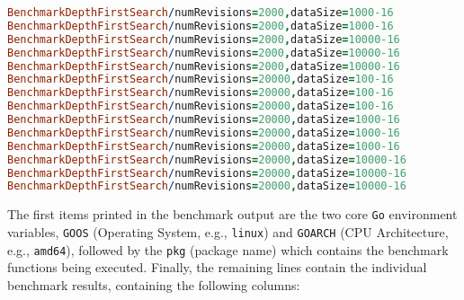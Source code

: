 \begin{lstlisting}[language=prolog]
BenchmarkDepthFirstSearch/numRevisions=2000,dataSize=1000-16       	   39249	     92207 ns/op	   47674 B/op	      68 allocs/op
BenchmarkDepthFirstSearch/numRevisions=2000,dataSize=1000-16       	   39244	     93255 ns/op	   47894 B/op	      68 allocs/op
BenchmarkDepthFirstSearch/numRevisions=2000,dataSize=10000-16      	   41174	     83079 ns/op	   47819 B/op	      68 allocs/op
BenchmarkDepthFirstSearch/numRevisions=2000,dataSize=10000-16      	   41455	     83561 ns/op	   47678 B/op	      68 allocs/op
BenchmarkDepthFirstSearch/numRevisions=2000,dataSize=10000-16      	   43261	     83705 ns/op	   48038 B/op	      68 allocs/op
BenchmarkDepthFirstSearch/numRevisions=20000,dataSize=100-16       	    3747	   1041382 ns/op	  479952 B/op	     364 allocs/op
BenchmarkDepthFirstSearch/numRevisions=20000,dataSize=100-16       	    3386	   1035490 ns/op	  477039 B/op	     362 allocs/op
BenchmarkDepthFirstSearch/numRevisions=20000,dataSize=100-16       	    3760	   1023241 ns/op	  472936 B/op	     360 allocs/op
BenchmarkDepthFirstSearch/numRevisions=20000,dataSize=1000-16      	    3687	    881654 ns/op	  471495 B/op	     358 allocs/op
BenchmarkDepthFirstSearch/numRevisions=20000,dataSize=1000-16      	    4036	    883816 ns/op	  479999 B/op	     364 allocs/op
BenchmarkDepthFirstSearch/numRevisions=20000,dataSize=1000-16      	    4092	    876104 ns/op	  476561 B/op	     363 allocs/op
BenchmarkDepthFirstSearch/numRevisions=20000,dataSize=10000-16     	    4383	    820963 ns/op	  472796 B/op	     360 allocs/op
BenchmarkDepthFirstSearch/numRevisions=20000,dataSize=10000-16     	    4129	    829324 ns/op	  480041 B/op	     366 allocs/op
BenchmarkDepthFirstSearch/numRevisions=20000,dataSize=10000-16     	    3768	    825202 ns/op	  474170 B/op	     361 allocs/op
\end{lstlisting}
\medskip

The first items printed in the benchmark output are the two core \lstinline{Go} environment variables, \lstinline{GOOS} (Operating System, e.g., \lstinline{linux}) and \lstinline{GOARCH} (CPU Architecture, e.g., \lstinline{amd64}), followed by the \lstinline{pkg} (package name) which contains the benchmark functions being executed. Finally, the remaining lines contain the individual benchmark results, containing the following columns\cite{andile_2023}:

